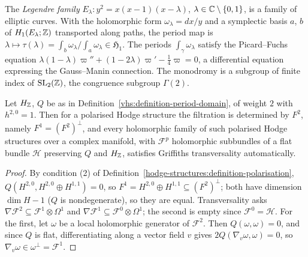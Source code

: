\begin{example}\label{vhs:example-legendre}
The \emph{Legendre family} $E_\lambda \colon y^2 = x(x - 1)(x - \lambda)$, $\lambda \in \mathbb{C} \setminus \{0, 1\}$, is a family of elliptic curves. With the holomorphic form $\omega_\lambda = dx/y$
and a symplectic basis $a$, $b$ of $H_1(E_\lambda; \mathbb{Z})$ transported along paths, the period map is $\lambda \mapsto \tau(\lambda) = \int_b\omega_\lambda/\int_a\omega_\lambda \in \mathfrak{H}_1$. The periods
$\int_\gamma\omega_\lambda$ satisfy the Picard--Fuchs equation $\lambda(1 - \lambda)\varpi'' + (1 - 2\lambda)\varpi' - \frac14\varpi = 0$, a differential equation expressing the Gauss--Manin connection.
The monodromy is a subgroup of finite index of $\mathrm{SL}_2(\mathbb{Z})$, the congruence subgroup $\Gamma(2)$.
\end{example}

\begin{proposition}\label{vhs:proposition-k3-transversality}
Let $H_{\mathbb{Z}}$, $Q$ be as in Definition~\ref{vhs:definition-period-domain}, of weight $2$ with $h^{2,0} = 1$. Then for a polarised Hodge structure the filtration is determined by $F^2$, namely
$F^1 = (F^2)^\perp$, and every holomorphic family of such polarised Hodge structures over a complex manifold, with $\mathcal{F}^p$ holomorphic subbundles of a flat bundle $\mathcal{H}$ preserving $Q$ and
$H_{\mathbb{Z}}$, satisfies Griffiths transversality automatically.
\end{proposition}

\begin{proof}
By condition (2) of Definition~\ref{hodge-structures:definition-polarisation}, $Q(H^{2,0}, H^{2,0} \oplus H^{1,1}) = 0$, so $F^1 = H^{2,0} \oplus H^{1,1} \subseteq (F^2)^\perp$; both have dimension
$\dim H - 1$ ($Q$ is nondegenerate), so they are equal. Transversality asks $\nabla\mathcal{F}^2 \subseteq \mathcal{F}^1 \otimes \Omega^1$ and $\nabla\mathcal{F}^1 \subseteq \mathcal{F}^0 \otimes \Omega^1$; the second
is empty since $\mathcal{F}^0 = \mathcal{H}$. For the first, let $\omega$ be a local holomorphic generator of $\mathcal{F}^2$. Then $Q(\omega, \omega) = 0$, and since $Q$ is flat, differentiating along a
vector field $v$ gives $2Q(\nabla_v\omega, \omega) = 0$, so $\nabla_v\omega \in \omega^\perp = \mathcal{F}^1$.
\end{proof}

